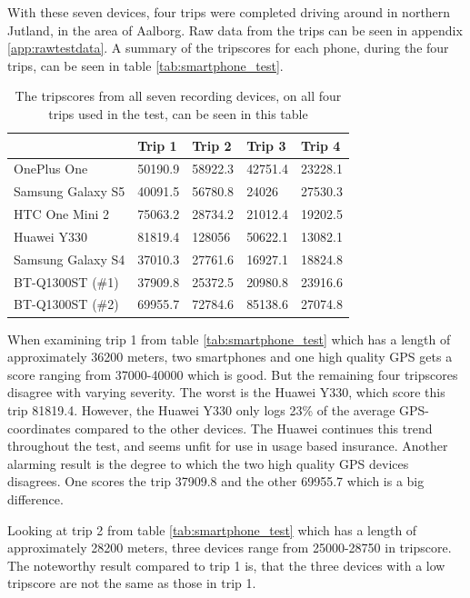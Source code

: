 With these seven devices, four trips were completed driving around in northern Jutland, in the area of Aalborg. Raw data from the trips can be seen in appendix \ref{app:rawtestdata}. A summary of the tripscores for each phone, during the four trips, can be seen in table \ref{tab:smartphone_test}.

\begin{table}[tb]
\centering
\caption{The tripscores from all seven recording devices, on all four trips used in the test, can be seen in this table}
\label{tab:smartphone_test_one}
\begin{tabular}{|l|llll|}
\hline
\rowcolor{tablegreen}

                   & Trip 1    & Trip 2    & Trip 3    & Trip 4  \\\hline
OnePlus One        & 50190.9   & 58922.3   & 42751.4   & 23228.1 \\
Samsung Galaxy S5  & 40091.5   & 56780.8   & 24026     & 27530.3 \\
HTC One Mini 2     & 75063.2   & 28734.2   & 21012.4   & 19202.5 \\
Huawei Y330        & 81819.4   & 128056    & 50622.1   & 13082.1 \\
Samsung Galaxy S4  & 37010.3   & 27761.6   & 16927.1   & 18824.8 \\
BT-Q1300ST (\#1)   & 37909.8   & 25372.5   & 20980.8   & 23916.6 \\
BT-Q1300ST (\#2)   & 69955.7   & 72784.6   & 85138.6   & 27074.8 \\\hline

\end{tabular}
\end{table}

When examining trip 1 from table \ref{tab:smartphone_test} which has a length of approximately 36200 meters, two smartphones and one high quality GPS gets a score ranging from 37000-40000 which is good. But the remaining four tripscores disagree with varying severity. The worst is the Huawei Y330, which score this trip 81819.4. However, the Huawei Y330 only logs 23\% of the average GPS-coordinates compared to the other devices. The Huawei continues this trend throughout the test, and seems unfit for use in usage based insurance. Another alarming result is the degree to which the two high quality GPS devices disagrees. One scores the trip 37909.8 and the other 69955.7 which is a big difference.

Looking at trip 2 from table \ref{tab:smartphone_test} which has a length of approximately 28200 meters, three devices range from 25000-28750 in tripscore. The noteworthy result compared to trip 1 is, that the three devices with a low tripscore are not the same as those in trip 1.

